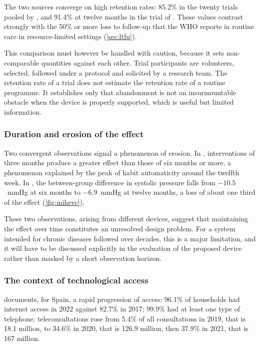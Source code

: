 \documentclass[12pt,a4paper,oneside]{report}
\begin{document}
The two sources converge on high retention rates: 85.2\% in the twenty trials pooled by \textcite{zhou2024}, and 91.4\% at twelve months in the trial of \textcite{mihevc2025}. These values contrast strongly with the 50\% or more loss to follow-up that the WHO reports in routine care in resource-limited settings (\cref{sec:ltfu}).

This comparison must however be handled with caution, because it sets non-comparable quantities against each other. Trial participants are volunteers, selected, followed under a protocol and solicited by a research team. The retention rate of a trial does not estimate the retention rate of a routine programme. It establishes only that abandonment is not an insurmountable obstacle when the device is properly supported, which is useful but limited information.

\subsubsection{Duration and erosion of the effect}

Two convergent observations signal a phenomenon of erosion. In \textcite{zhou2024}, interventions of three months produce a greater effect than those of six months or more, a phenomenon explained by the peak of habit automaticity around the twelfth week. In \textcite{mihevc2025}, the between-group difference in systolic pressure falls from $-10.5$~mmHg at six months to $-6.9$~mmHg at twelve months, a loss of about one third of the effect (\cref{fig:mihevc}).

These two observations, arising from different devices, suggest that maintaining the effect over time constitutes an unresolved design problem. For a system intended for chronic diseases followed over decades, this is a major limitation, and it will have to be discussed explicitly in the evaluation of the proposed device rather than masked by a short observation horizon.

\subsubsection{The context of technological access}

\textcite{navarro2023} documents, for Spain, a rapid progression of access: 96.1\% of households had internet access in 2022 against 82.7\% in 2017; 99.9\% had at least one type of telephone; teleconsultations rose from 5.4\% of all consultations in 2019, that is 18.1 million, to 34.6\% in 2020, that is 126.9 million, then 37.9\% in 2021, that is 167 million.
\end{document}
